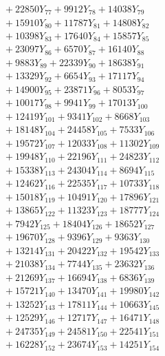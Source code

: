 \documentclass[a4paper,10pt]{article}
\begin{document}
{\begin{align}
&\;  + 22850 Y_{77} + 9912 Y_{78} + 14038 Y_{79} \\[0.3ex]
&\;  + 15910 Y_{80} + 11787 Y_{81} + 14808 Y_{82} \\[0.3ex]
&\;  + 10398 Y_{83} + 17640 Y_{84} + 15857 Y_{85} \\[0.3ex]
&\;  + 23097 Y_{86} + 6570 Y_{87} + 16140 Y_{88} \\[0.5ex]\allowbreak
&\;  + 9883 Y_{89} + 22339 Y_{90} + 18638 Y_{91} \\[0.3ex]
&\;  + 13329 Y_{92} + 6654 Y_{93} + 17117 Y_{94} \\[0.3ex]
&\;  + 14900 Y_{95} + 23871 Y_{96} + 8053 Y_{97} \\[0.3ex]
&\;  + 10017 Y_{98} + 9941 Y_{99} + 17013 Y_{100} \\[0.3ex]
&\;  + 12419 Y_{101} + 9341 Y_{102} + 8668 Y_{103} \\[0.3ex]
&\;  + 18148 Y_{104} + 24458 Y_{105} + 7533 Y_{106} \\[0.3ex]
&\;  + 19572 Y_{107} + 12033 Y_{108} + 11302 Y_{109} \\[0.3ex]
&\;  + 19948 Y_{110} + 22196 Y_{111} + 24823 Y_{112} \\[0.3ex]
&\;  + 15338 Y_{113} + 24304 Y_{114} + 8694 Y_{115} \\[0.3ex]
&\;  + 12462 Y_{116} + 22535 Y_{117} + 10733 Y_{118} \\[0.5ex]\allowbreak
&\;  + 15018 Y_{119} + 10491 Y_{120} + 17896 Y_{121} \\[0.3ex]
&\;  + 13865 Y_{122} + 11323 Y_{123} + 18777 Y_{124} \\[0.3ex]
&\;  + 7942 Y_{125} + 18404 Y_{126} + 18652 Y_{127} \\[0.3ex]
&\;  + 19670 Y_{128} + 9396 Y_{129} + 9363 Y_{130} \\[0.3ex]
&\;  + 13214 Y_{131} + 20422 Y_{132} + 19542 Y_{133} \\[0.3ex]
&\;  + 21038 Y_{134} + 7744 Y_{135} + 23632 Y_{136} \\[0.3ex]
&\;  + 21269 Y_{137} + 16694 Y_{138} + 6836 Y_{139} \\[0.3ex]
&\;  + 15721 Y_{140} + 13470 Y_{141} + 19980 Y_{142} \\[0.3ex]
&\;  + 13252 Y_{143} + 17811 Y_{144} + 10663 Y_{145} \\[0.3ex]
&\;  + 12529 Y_{146} + 12717 Y_{147} + 16471 Y_{148} \\[0.5ex]\allowbreak
&\;  + 24735 Y_{149} + 24581 Y_{150} + 22541 Y_{151} \\[0.3ex]
&\;  + 16228 Y_{152} + 23674 Y_{153} + 14251 Y_{154} \\[0.3ex]

\end{align}}
\end{document}
